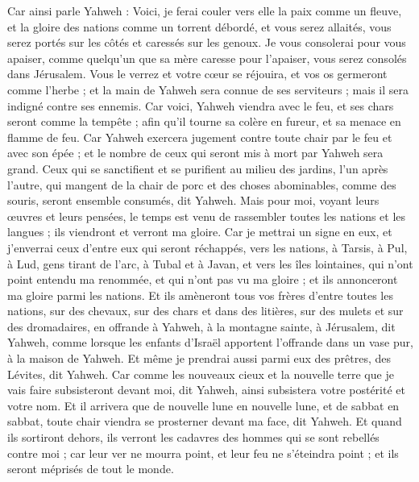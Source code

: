 \begin{multicols}{2}
Car ainsi parle Yahweh : Voici, je ferai couler vers elle la paix comme un fleuve, et la gloire des nations comme un torrent débordé, et vous serez allaités, vous serez portés sur les côtés et caressés sur les genoux.
Je vous consolerai pour vous apaiser, comme quelqu'un que sa mère caresse pour l'apaiser, vous serez consolés dans Jérusalem.
Vous le verrez et votre cœur se réjouira, et vos os germeront comme l'herbe ; et la main de Yahweh sera connue de ses serviteurs ; mais il sera indigné contre ses ennemis.
Car voici, Yahweh viendra avec le feu, et ses chars seront comme la tempête ; afin qu'il tourne sa colère en fureur, et sa menace en flamme de feu.
Car Yahweh exercera jugement contre toute chair par le feu et avec son épée ; et le nombre de ceux qui seront mis à mort par Yahweh sera grand.
Ceux qui se sanctifient et se purifient au milieu des jardins, l'un après l'autre, qui mangent de la chair de porc et des choses abominables, comme des souris, seront ensemble consumés, dit Yahweh.
Mais pour moi, voyant leurs œuvres et leurs pensées, le temps est venu de rassembler toutes les nations et les langues ; ils viendront et verront ma gloire.
Car je mettrai un signe en eux, et j'enverrai ceux d'entre eux qui seront réchappés, vers les nations, à Tarsis, à Pul, à Lud, gens tirant de l'arc, à Tubal et à Javan, et vers les îles lointaines, qui n'ont point entendu ma renommée, et qui n'ont pas vu ma gloire ; et ils annonceront ma gloire parmi les nations.
Et ils amèneront tous vos frères d'entre toutes les nations, sur des chevaux, sur des chars et dans des litières, sur des mulets et sur des dromadaires, en offrande à Yahweh, à la montagne sainte, à Jérusalem, dit Yahweh, comme lorsque les enfants d'Israël apportent l'offrande dans un vase pur, à la maison de Yahweh.
Et même je prendrai aussi parmi eux des prêtres, des Lévites, dit Yahweh.
Car comme les nouveaux cieux et la nouvelle terre que je vais faire subsisteront devant moi, dit Yahweh, ainsi subsistera votre postérité et votre nom.
Et il arrivera que de nouvelle lune en nouvelle lune, et de sabbat en sabbat, toute chair viendra se prosterner devant ma face, dit Yahweh.
Et quand ils sortiront dehors, ils verront les cadavres des hommes qui se sont rebellés contre moi ; car leur ver ne mourra point, et leur feu ne s'éteindra point ; et ils seront méprisés de tout le monde.
\PPE{}
\end{multicols}
